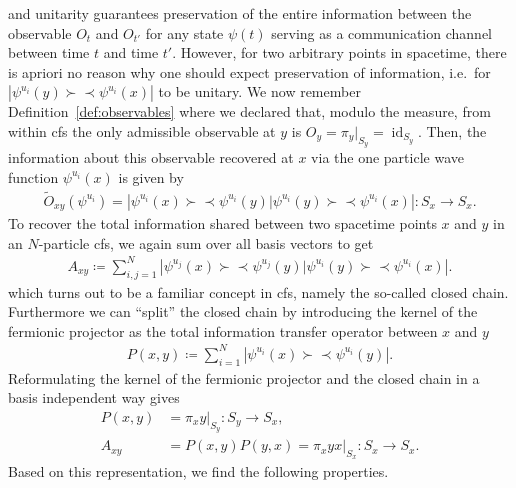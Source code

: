\documentclass[reqno,11pt]{amsart}
\DeclareMathOperator{\id}{id}
\newcommand{\defeq}{\coloneqq}
\newcommand{\spinbra}[1]{\left. \prec #1 \right|}
\newcommand{\spinket}[1]{\left| #1 \succ \right.}
\newcommand{\spinbraket}[2]{\prec #1 | #2 \succ}
\numberwithin{equation}{section}
\begin{document}
and unitarity guarantees preservation of the entire information between the observable $O_t$ and $O_{t'}$ for any state $\psi(t)$ serving as a communication channel between time $t$ and time $t'$.
However, for two arbitrary points in spacetime, there is apriori no reason why one should expect preservation of information,
i.e.~for $\spinket{\psi^{u_i}(y)} \spinbra{\psi^{u_i}(x)}$ to be unitary.
We now remember Definition~\ref{def:observables} where we declared that, modulo the measure, from within \ac{cfs} the
only admissible observable at $y$ is
$O_y = \pi_y |_{S_y} = \id_{S_y}$.
Then, the information about this observable recovered at $x$ via the one particle wave function $\psi^{u_i}(x)$ is given by
\begin{align}
    \tilde O_{xy}(\psi^{u_i})=   \spinket{\psi^{u_i}(x)} \spinbraket{\psi^{u_i}(y)}{\psi^{u_i}(y)} \spinbra{\psi^{u_i}(x)} : S_x \rightarrow S_x.
\end{align}
To recover the total information shared between two spacetime points $x$ and $y$ in an $N$-particle \ac{cfs}, we again sum
over all basis vectors to get
\begin{align}
    A_{xy} \defeq \sum_{i, j = 1}^N \spinket{\psi^{u_j}(x)} \spinbraket{\psi^{u_j}(y)}{\psi^{u_i}(y)} \spinbra{\psi^{u_i}(x)}.
\end{align}
which turns out to be a familiar concept in \ac{cfs}, namely the so-called closed chain. Furthermore we can ``split'' the closed chain by introducing the kernel of the fermionic projector as the total information transfer operator between $x$ and $y$
\begin{align}
    \label{eq:kernel-of-the-fermionic-projector}
    P(x,y) \defeq \sum_{i = 1}^N \spinket{\psi^{u_i}(x)} \spinbra{\psi^{u_i}(y)}.
\end{align}
Reformulating the kernel of the fermionic projector and the closed chain in a basis independent way gives
\begin{align}
    P(x, y) &= \pi_x y|_{S_y} : S_y \to S_x, \\
    A_{xy} &= P(x, y) P(y, x) = \pi_x y x|_{S_x}  : S_x \to S_x.
\end{align}
Based on this representation, we find the following properties.
\end{document}
